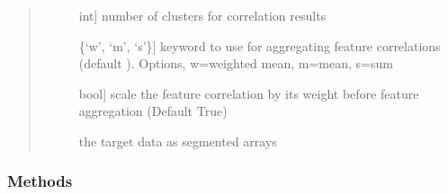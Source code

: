 \documentclass[letterpaper,10pt,english]{sphinxmanual}
\begin{document}
\begin{fulllineitems}
\begin{fulllineitems}
\begin{quote}
\begin{description}
\begin{description}
\item[{}] \leavevmode{[}int{]}
\sphinxAtStartPar
number of clusters for correlation results

\item[{}] \leavevmode{[}\{‘w’, ‘m’, ‘s’\}{]}
\sphinxAtStartPar
keyword to use for aggregating feature correlations (default ).
Options, w=weighted mean, m=mean, s=sum

\item[{}] \leavevmode{[}bool{]}
\sphinxAtStartPar
scale the feature correlation by its weight before feature
aggregation (Default True)

\item[{}] \leavevmode{[}{[}{]}{]}
\sphinxAtStartPar
the target data as segmented arrays

\end{description}

\end{description}\end{quote}

\end{fulllineitems}

\subsubsection*{Methods}


\begin{savenotes}\sphinxatlongtablestart\begin{longtable}[c]{}
\hline

\endfirsthead

%
{}\\
\hline

\endhead

\hline
{}\\
\endfoot

\endlastfoot


\end{longtable}
\end{savenotes}
\end{fulllineitems}
\end{document}
